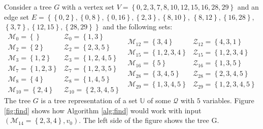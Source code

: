 Consider a tree $G$ with a vertex set
$V=\left\{0,2,3,7,8,10,12,15,16,28,29\right\}$
and an edge set
$E = \left\{\left\{0,2\right\}, \left\{0,8\right\}, \left\{0,16\right\},
\left\{2,3\right\}, \left\{8,10\right\}\right.$, $\left.\left\{8,12\right\},
\left\{16,28\right\},\right.$
$\left.\left\{3,7\right\}, \left\{12,15\right\},
\left\{28,29\right\}\right\}$
and the following sets:
\[
    \begin{array}{ll}
        \mathcal{M}_0    = \left\{{}\right\}           & \mathcal{Z}_0    = \left\{{1,3}\right\} \\
        \mathcal{M}_2    = \left\{{2}\right\}          & \mathcal{Z}_2    = \left\{{2,3,5}\right\} \\
        \mathcal{M}_3    = \left\{{1,2}\right\}        & \mathcal{Z}_3    = \left\{{1,2,4,5}\right\} \\
        \mathcal{M}_7    = \left\{{1,2,3}\right\}      & \mathcal{Z}_7    = \left\{{1,2,3,5}\right\} \\
        \mathcal{M}_8    = \left\{{4}\right\}          & \mathcal{Z}_8    = \left\{{1,4,5}\right\} \\
        \mathcal{M}_{10} = \left\{{2,4}\right\}        & \mathcal{Z}_{10} = \left\{{2,3,4,5}\right\}
    \end{array}
~
    \begin{array}{ll}
        \mathcal{M}_{12} = \left\{{3,4}\right\}        & \mathcal{Z}_{12} = \left\{{4,3,1}\right\} \\
        \mathcal{M}_{15} = \left\{{1,2,3,4}\right\}    & \mathcal{Z}_{15} = \left\{{1,2,3,4}\right\} \\
        \mathcal{M}_{16} = \left\{{5}\right\}          & \mathcal{Z}_{16} = \left\{{1,3,5}\right\} \\
        \mathcal{M}_{28} = \left\{{3,4,5}\right\}      & \mathcal{Z}_{28} = \left\{{2,3,4,5}\right\} \\
        \mathcal{M}_{29} = \left\{{1,3,4,5}\right\}    & \mathcal{Z}_{29} = \left\{{1,2,3,4,5}\right\}
    \end{array}
\]
The tree $G$ is a tree representation of a set $\mathbb{U}$ of some
$\mathcal{Q}$ with $5$ variables.
Figure \ref{fig:find} shows how Algorithm \ref{alg:find} would work with input
$(\mathcal{M}_{14} = \left\{{2,3,4}\right\}, v_0)$.
The left side of the figure shows the tree G.

